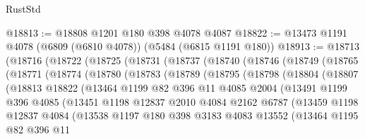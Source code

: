 \begin{lexlean}{RustStd}
\begin{coremodule}
@18813 := @18808 @1201 @180 @398 @4078 @4087
@18822 := @13473 @1191 @4078 (@6809 (@6810 @4078)) (@5484 (@6815 @1191 @180))
@18913 := @18713
    (@18716
      (@18722
        (@18725
          (@18731
            (@18737
              (@18740
                (@18746
                  (@18749
                    (@18765
                      (@18771
                        (@18774
                          (@18780
                            (@18783
                              (@18789
                                (@18795
                                  (@18798
                                    (@18804
                                      (@18807
                                        (@18813
                                          @18822
                                          (@13464
                                            @1199
                                            @82
                                            @396
                                            @11
                                            @4085
                                            @2004
                                            (@13491
                                              @1199
                                              @396
                                              @4085
                                              (@13451
                                                @1198
                                                @12837
                                                @2010
                                                @4084
                                                @2162
                                                @6787
                                                (@13459
                                                  @1198
                                                  @12837
                                                  @4084
                                                  (@13538
                                                    @1197
                                                    @180
                                                    @398
                                                    @3183
                                                    @4083
                                                    @13552
                                                    (@13464
                                                      @1195
                                                      @82
                                                      @396
                                                      @11

\end{coremodule}
\end{lexlean}
